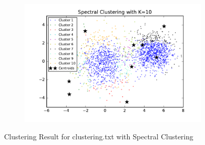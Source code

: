\begin{figure}[htb]
\begin{subfigure}[b]{0.475\textwidth}
        \end{subfigure}
        \hfill
        \begin{subfigure}[b]{0.475\textwidth}   
            \centering 
            \includegraphics[width=\textwidth]{./figures/clustering_spectral_10.pdf}
        \end{subfigure}
        
        \caption{Clustering Result for clustering.txt with Spectral Clustering}
        \label{fig:kmean_clustering}
\end{figure}

